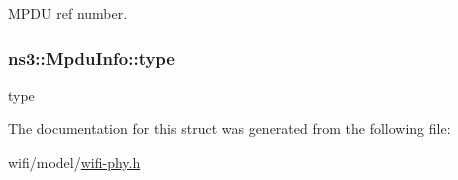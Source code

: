 M\+P\+DU ref number. 

\subsubsection[{\texorpdfstring{type}{type}}]{ ns3\+::\+Mpdu\+Info\+::type}\hypertarget{structns3_1_1MpduInfo_a2b64427e769b57595e1d1c239c62784d}{}\label{structns3_1_1MpduInfo_a2b64427e769b57595e1d1c239c62784d}


type 



The documentation for this struct was generated from the following file\+:\begin{DoxyCompactItemize}
\item 
wifi/model/\hyperlink{wifi-phy_8h}{wifi-\/phy.\+h}\end{DoxyCompactItemize}
